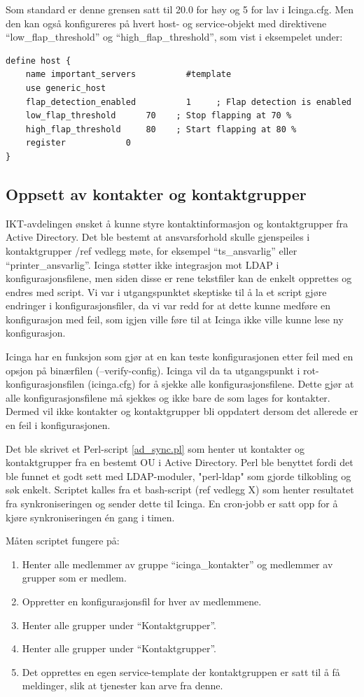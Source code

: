 Som standard er denne grensen satt til 20.0 for høy og 5 for lav i Icinga.cfg. Men den kan også konfigureres på hvert host- og service-objekt med direktivene “low\_flap\_threshold” og “high\_flap\_threshold”, som vist i eksempelet under:

\begin{lstlisting}
define host {
	name important_servers  		#template
	use generic_host
	flap_detection_enabled          1     ; Flap detection is enabled
	low_flap_threshold		70    ; Stop flapping at 70 %
	high_flap_threshold		80    ; Start flapping at 80 %
	register			0
}
\end{lstlisting}

\subsection{Oppsett av kontakter og kontaktgrupper}


IKT-avdelingen ønsket å kunne styre kontaktinformasjon og kontaktgrupper fra Active Directory. Det ble bestemt at ansvarsforhold skulle gjenspeiles i kontaktgrupper /ref vedlegg møte, for eksempel “ts\_ansvarlig” eller “printer\_ansvarlig”. Icinga støtter ikke integrasjon mot LDAP i konfigurasjonsfilene, men siden disse er rene tekstfiler kan de enkelt opprettes og endres med script. Vi var i utgangspunktet skeptiske til å la et script gjøre endringer i konfigurasjonsfiler, da vi var redd for at dette kunne medføre en konfigurasjon med feil, som igjen ville føre til at Icinga ikke ville kunne lese ny konfigurasjon. 

Icinga har en funksjon som gjør at en kan teste konfigurasjonen etter feil med en opsjon på binærfilen (--verify-config). Icinga vil da ta utgangspunkt i rot-konfigurasjonsfilen (icinga.cfg) for å sjekke alle konfigurasjonsfilene. Dette gjør at alle konfigurasjonsfilene må sjekkes og ikke bare de som lages for kontakter. Dermed vil ikke kontakter og kontaktgrupper bli oppdatert dersom det allerede er en feil i konfigurasjonen. 

Det ble skrivet et Perl-script \ref{ad_sync.pl}  som henter ut kontakter og kontaktgrupper fra en bestemt OU i Active Directory. Perl ble benyttet fordi det ble funnet et godt sett med LDAP-moduler, "perl-ldap" \cite{perlldap} som gjorde tilkobling og søk enkelt. Scriptet kalles fra et bash-script (ref vedlegg X) som henter resultatet fra synkroniseringen og sender dette til Icinga. En cron-jobb er satt opp for å kjøre synkroniseringen én gang i timen.

Måten scriptet fungere på:
\begin{enumerate}
	\item Henter alle medlemmer av gruppe “icinga\_kontakter” og medlemmer av grupper som er medlem.
	\item Oppretter en konfigurasjonsfil for hver av medlemmene.
	\item Henter alle grupper under “Kontaktgrupper”.
	\item Henter alle grupper under “Kontaktgrupper”.
	\item Det opprettes en egen service-template der kontaktgruppen er satt til å få meldinger, slik at tjenester kan arve fra denne.
\end{enumerate}

